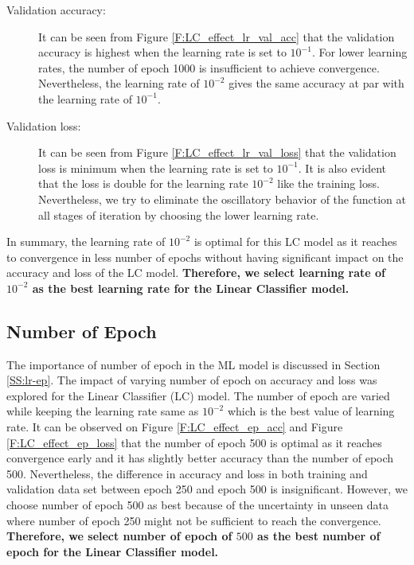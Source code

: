 \documentclass[12pt, a4paper, twoside]{article}
\begin{document}
\begin{description}
	\item[Validation accuracy:] It can be seen from Figure \ref{F:LC_effect_lr_val_acc} that the validation accuracy is highest when the learning rate is set to $10^{-1}$.  For lower learning rates, the number of epoch 1000 is insufficient to achieve convergence. Nevertheless, the learning rate of $10^{-2}$ gives the same accuracy at par with the learning rate of $10^{-1}$.
	\item[Validation loss:] It can be seen from Figure \ref{F:LC_effect_lr_val_loss} that the validation loss is minimum when the learning rate is set to $10^{-1}$. It is also evident that the loss is double for the learning rate $10^{-2}$ like the training loss. Nevertheless, we try to eliminate the oscillatory behavior of the function at all stages of iteration by choosing the lower learning rate. 
\end{description}
\par
In summary, the learning rate of $10^{-2}$ is optimal for this LC model as it reaches to convergence in less number of epochs without having significant impact on the accuracy and loss of the LC model. \textbf{Therefore, we select learning rate of $10^{-2}$ as the best learning rate for the Linear Classifier model.}
\subsection{Number of Epoch}\label{SS:lc-ep}
The importance of number of epoch in the ML model is discussed in Section \ref{SS:lr-ep}. The impact of varying number of epoch on accuracy and loss was explored for the Linear Classifier (LC) model. The number of epoch are varied while keeping the learning rate same as $10^{-2}$ which is the best value of learning rate. It can be observed on Figure \ref{F:LC_effect_ep_acc} and Figure \ref{F:LC_effect_ep_loss} that the number of epoch 500 is optimal as it reaches convergence early and it has slightly better accuracy than the number of epoch 500. Nevertheless, the difference in accuracy and loss in both training and validation data set between epoch 250 and epoch 500 is insignificant. However, we choose number of epoch 500 as best because of the uncertainty in unseen data where number of epoch 250 might not be sufficient to reach the convergence. \textbf{Therefore, we select number of epoch of $500$ as the best number of epoch for the Linear Classifier model.}
\end{document}
